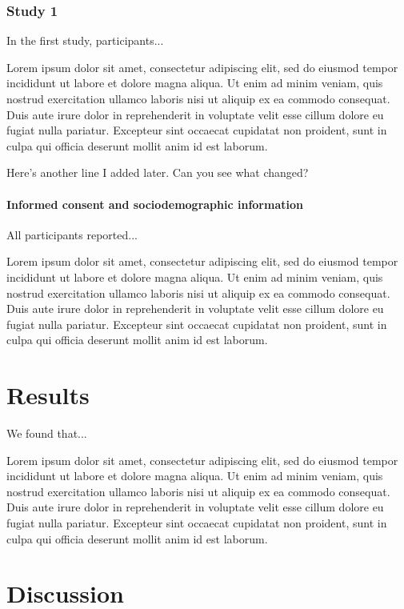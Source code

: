 \documentclass[jou, floatsintext, colorlinks=true, linkcolor=blue, citecolor=blue, urlcolor=blue]{apa7} %
\begin{document}
\subsubsection{Study 1}

In the first study, participants...

Lorem ipsum dolor sit amet, consectetur adipiscing elit, sed do eiusmod tempor incididunt ut labore et dolore magna aliqua. Ut enim ad minim veniam, quis nostrud exercitation ullamco laboris nisi ut aliquip ex ea commodo consequat. Duis aute irure dolor in reprehenderit in voluptate velit esse cillum dolore eu fugiat nulla pariatur. Excepteur sint occaecat cupidatat non proident, sunt in culpa qui officia deserunt mollit anim id est laborum.

Here's another line I added later. Can you see what changed?

\paragraph{Informed consent and sociodemographic information}

All participants reported...

Lorem ipsum dolor sit amet, consectetur adipiscing elit, sed do eiusmod tempor incididunt ut labore et dolore magna aliqua. Ut enim ad minim veniam, quis nostrud exercitation ullamco laboris nisi ut aliquip ex ea commodo consequat. Duis aute irure dolor in reprehenderit in voluptate velit esse cillum dolore eu fugiat nulla pariatur. Excepteur sint occaecat cupidatat non proident, sunt in culpa qui officia deserunt mollit anim id est laborum.

\section{Results}

We found that...

Lorem ipsum dolor sit amet, consectetur adipiscing elit, sed do eiusmod tempor incididunt ut labore et dolore magna aliqua. Ut enim ad minim veniam, quis nostrud exercitation ullamco laboris nisi ut aliquip ex ea commodo consequat. Duis aute irure dolor in reprehenderit in voluptate velit esse cillum dolore eu fugiat nulla pariatur. Excepteur sint occaecat cupidatat non proident, sunt in culpa qui officia deserunt mollit anim id est laborum.

\section{Discussion}
\end{document}
